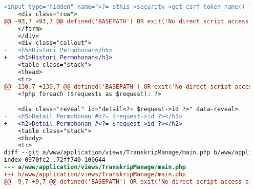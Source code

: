 \begin{itemize}
\begin{lstlisting}[frame=single, label={lst:perbaikan_1.3.1_tag_heading}, language=diff, caption=Perbaikan Kriteria Sukses 1.3.1 - Penggunaan \textit{Heading} Tidak Tepat]
    <input type="hidden" name="<?= $this->security->get_csrf_token_name() ?>" value="<?= $this->security->get_csrf_hash() ?>" />
    <div class="row">
@@ -93,7 +93,7 @@ defined('BASEPATH') OR exit('No direct script access allowed');
    </form>
    </div>
    <div class="callout">
-   <h5>Histori Permohonan</h5>
+   <h1>Histori Permohonan</h1>
    <table class="stack">
    <thead>
    <tr>
@@ -130,7 +130,7 @@ defined('BASEPATH') OR exit('No direct script access allowed');
    <?php foreach ($requests as $request): ?>

    <div class="reveal" id="detail<?= $request->id ?>" data-reveal>
-   <h5>Detail Permohonan #<?= $request->id ?></h5>
+   <h2>Detail Permohonan #<?= $request->id ?></h2>
    <table class="stack">
    <tbody>
    <tr>
diff --git a/www/application/views/TranskripManage/main.php b/www/application/views/TranskripManage/main.php
index 0970fc2..72ff740 100644
--- a/www/application/views/TranskripManage/main.php
+++ b/www/application/views/TranskripManage/main.php
@@ -9,7 +9,7 @@ defined('BASEPATH') OR exit('No direct script access allowed');


\end{lstlisting}
\end{itemize}
